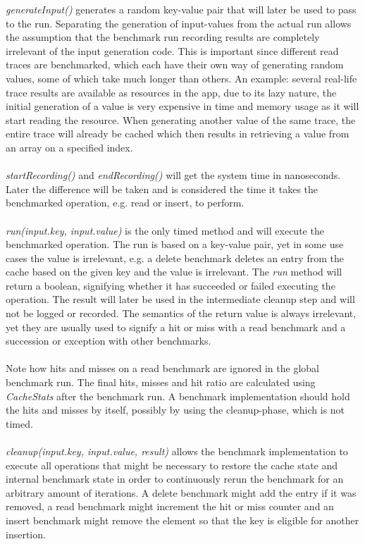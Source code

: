 \documentclass[pdftex,a4paper,12pt,twoside]{report}
\begin{document}
\emph{generateInput()} generates a random key-value pair that will later be used to pass to the run. Separating the generation of input-values from the actual run allows the assumption that the benchmark run recording results are completely irrelevant of the input generation code. This is important since different read traces are benchmarked, which each have their own way of generating random values, some of which take much longer than others. An example: several real-life trace results are available as resources in the app, due to its lazy nature, the initial generation of a value is very expensive in time and memory usage as it will start reading the resource. When generating another value of the same trace, the entire trace will already be cached which then results in retrieving a value from an array on a specified index.
\\\\
\emph{startRecording()} and \emph{endRecording()} will get the system time in nanoseconds. Later the difference will be taken and is considered the time it takes the benchmarked operation, e.g. read or insert, to perform.
\\\\
\emph{run(input.key, input.value)} is the only timed method and will execute the benchmarked operation. The run is based on a key-value pair, yet in some use cases the value is irrelevant, e.g. a delete benchmark deletes an entry from the cache based on the given key and the value is irrelevant. The \emph{run} method will return a boolean, signifying whether it has succeeded or failed executing the operation. The result will later be used in the intermediate cleanup step and will not be logged or recorded. The semantics of the return value is always irrelevant, yet they are usually used to signify a hit or miss with a read benchmark and a succession or exception with other benchmarks.
\\\\
Note how hits and misses on a read benchmark are ignored in the global benchmark run. The final hits, misses and hit ratio are calculated using \emph{CacheStats} after the benchmark run. A benchmark implementation should hold the hits and misses by itself, possibly by using the cleanup-phase, which is not timed.
\\\\
\emph{cleanup(input.key, input.value, result)} allows the benchmark implementation to execute all operations that might be necessary to restore the cache state and internal benchmark state in order to continuously rerun the benchmark for an arbitrary amount of iterations. A delete benchmark might add the entry if it was removed, a read benchmark might increment the hit or miss counter and an insert benchmark might remove the element so that the key is eligible for another insertion.
\end{document}
